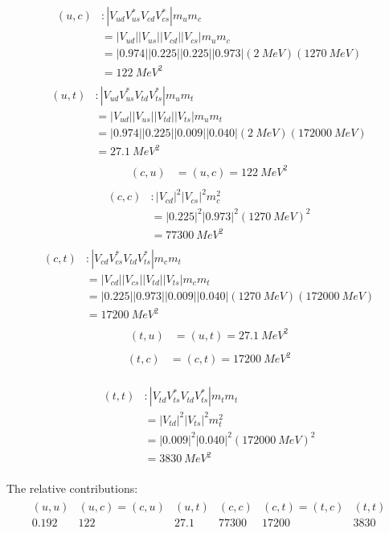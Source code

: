 \begin{align*}
    (u, c) &: |V_{ud} V_{us}^* V_{cd} V_{cs}^*| m_u m_{c} \\
    &= |V_{ud}| |V_{us}| |V_{cd}| |V_{cs}| m_u m_{c} \\
    &= |0.974| |0.225| |0.225| |0.973| (\SI{2}{MeV}) (\SI{1270}{MeV}) \\
    &= \SI{122}{MeV^2} \\
\end{align*}
\begin{align*}
    (u, t) &: |V_{ud} V_{us}^* V_{td} V_{ts}^*| m_u m_{t} \\
    &= |V_{ud}| |V_{us}| |V_{td}| |V_{ts}| m_u m_{t} \\
    &= |0.974| |0.225| |0.009| |0.040| (\SI{2}{MeV}) (\SI{172000}{MeV}) \\
    &= \SI{27.1}{MeV^2} \\
\end{align*}
\begin{align*}
    (c, u) &= (u, c) = \SI{122}{MeV^2} \\
\end{align*}
\begin{align*}
    (c, c) &: |V_{cd}|^2 |V_{cs}|^2 m_c^2 \\
    &=|0.225|^2 |0.973|^2 (\SI{1270}{MeV})^2 \\
    &= \SI{77300}{MeV^2} \\
\end{align*}
\begin{align*}
    (c, t) &: |V_{cd} V_{cs}^* V_{td} V_{ts}^*| m_c m_{t} \\
    &= |V_{cd}| |V_{cs}| |V_{td}| |V_{ts}| m_c m_{t} \\
    &= |0.225| |0.973| |0.009| |0.040| (\SI{1270}{MeV}) (\SI{172000}{MeV}) \\
    &= \SI{17200}{MeV^2} \\
\end{align*}
\begin{align*}
    (t, u) &= (u, t) = \SI{27.1}{MeV^2} \\
\end{align*}
\begin{align*}
    (t, c) &= (c, t) = \SI{17200}{MeV^2} \\
\end{align*}

\begin{align*}
    (t, t) &: |V_{td} V_{ts}^* V_{td} V_{ts}^*| m_t m_{t} \\
    &= |V_{td}|^2 |V_{ts}|^2 m_t^2 \\
    &= |0.009|^2 |0.040|^2 (\SI{172000}{MeV})^2 \\
    &= \SI{3830}{MeV^2} \\
\end{align*}

The relative contributions:
\begin{align*}
    \begin{matrix}
        (u,u) & (u,c)=(c,u) & (u,t) & (c,c) & (c,t)=(t,c) & (t,t) \\
        0.192 & 122 & 27.1 & 77300 & 17200 & 3830 \\
    \end{matrix}
\end{align*}
